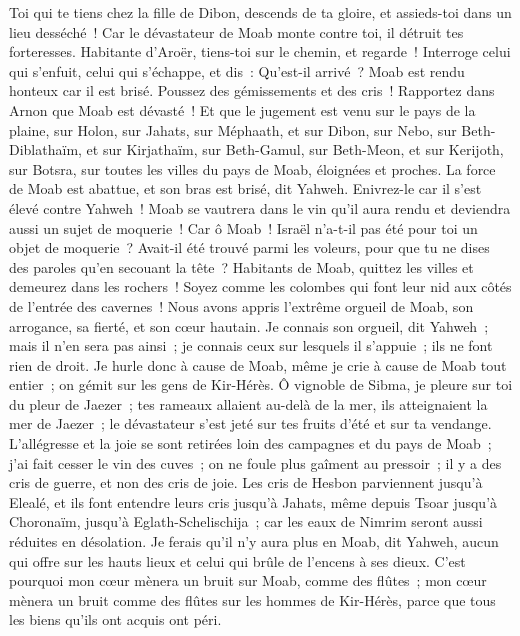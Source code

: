 \begin{multicols}{2}
Toi qui te tiens chez la fille de Dibon, descends de ta gloire, et assieds-toi dans un lieu desséché~! Car le dévastateur de Moab monte contre toi, il détruit tes forteresses.
Habitante d'Aroër, tiens-toi sur le chemin, et regarde~! Interroge celui qui s'enfuit, celui qui s'échappe, et dis~: Qu'est-il arrivé~?
Moab est rendu honteux car il est brisé. Poussez des gémissements et des cris~! Rapportez dans Arnon que Moab est dévasté~!
Et que le jugement est venu sur le pays de la plaine, sur Holon, sur Jahats, sur Méphaath,
et sur Dibon, sur Nebo, sur Beth-Diblathaïm,
et sur Kirjathaïm, sur Beth-Gamul, sur Beth-Meon,
et sur Kerijoth, sur Botsra, sur toutes les villes du pays de Moab, éloignées et proches.
La force de Moab est abattue, et son bras est brisé, dit Yahweh.
Enivrez-le car il s'est élevé contre Yahweh~! Moab se vautrera dans le vin qu'il aura rendu et deviendra aussi un sujet de moquerie~!
Car ô Moab~! Israël n'a-t-il pas été pour toi un objet de moquerie~? Avait-il été trouvé parmi les voleurs, pour que tu ne dises des paroles qu'en secouant la tête~?
Habitants de Moab, quittez les villes et demeurez dans les rochers~! Soyez comme les colombes qui font leur nid aux côtés de l'entrée des cavernes~!
Nous avons appris l'extrême orgueil de Moab, son arrogance, sa fierté, et son cœur hautain.
Je connais son orgueil, dit Yahweh~; mais il n'en sera pas ainsi~; je connais ceux sur lesquels il s'appuie~; ils ne font rien de droit. 
Je hurle donc à cause de Moab, même je crie à cause de Moab tout entier~; on gémit sur les gens de Kir-Hérès.
Ô vignoble de Sibma, je pleure sur toi du pleur de Jaezer~; tes rameaux allaient au-delà de la mer, ils atteignaient la mer de Jaezer~; le dévastateur s'est jeté sur tes fruits d'été et sur ta vendange.
L'allégresse et la joie se sont retirées loin des campagnes et du pays de Moab~; j'ai fait cesser le vin des cuves~; on ne foule plus gaîment au pressoir~; il y a des cris de guerre, et non des cris de joie.
Les cris de Hesbon parviennent jusqu'à Elealé, et ils font entendre leurs cris jusqu'à Jahats, même depuis Tsoar jusqu'à Choronaïm, jusqu'à Eglath-Schelischija~; car les eaux de Nimrim seront aussi réduites en désolation.
Je ferais qu'il n'y aura plus en Moab, dit Yahweh, aucun qui offre sur les hauts lieux et celui qui brûle de l'encens à ses dieux. 
C'est pourquoi mon cœur mènera un bruit sur Moab, comme des flûtes~; mon cœur mènera un bruit comme des flûtes sur les hommes de Kir-Hérès, parce que tous les biens qu'ils ont acquis ont péri.

\end{multicols}
